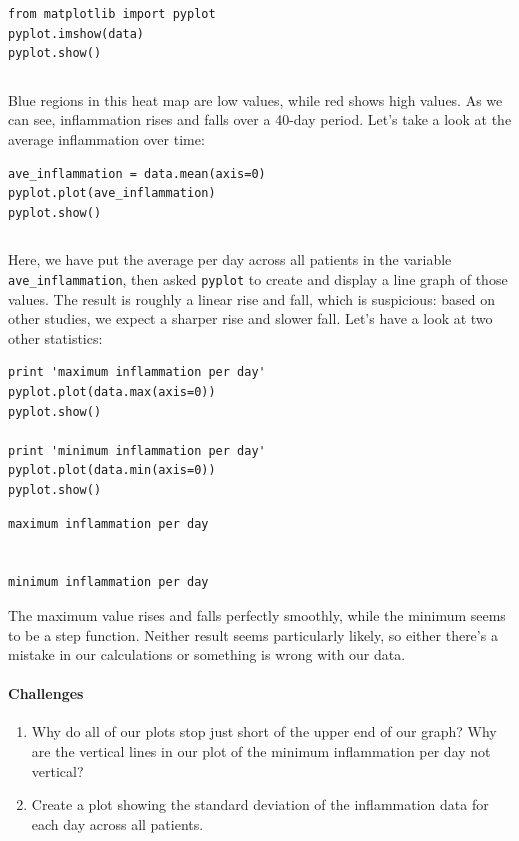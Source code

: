 \documentclass[]{book}
\begin{document}
\begin{verbatim}
from matplotlib import pyplot
pyplot.imshow(data)
pyplot.show()
\end{verbatim}

\begin{verbatim}
\end{verbatim}

Blue regions in this heat map are low values, while red shows high
values. As we can see, inflammation rises and falls over a 40-day
period. Let's take a look at the average inflammation over time:

\begin{verbatim}
ave_inflammation = data.mean(axis=0)
pyplot.plot(ave_inflammation)
pyplot.show()
\end{verbatim}

\begin{verbatim}
\end{verbatim}

Here, we have put the average per day across all patients in the
variable \texttt{ave\_inflammation}, then asked \texttt{pyplot} to
create and display a line graph of those values. The result is roughly a
linear rise and fall, which is suspicious: based on other studies, we
expect a sharper rise and slower fall. Let's have a look at two other
statistics:

\begin{verbatim}
print 'maximum inflammation per day'
pyplot.plot(data.max(axis=0))
pyplot.show()

print 'minimum inflammation per day'
pyplot.plot(data.min(axis=0))
pyplot.show()
\end{verbatim}

\begin{verbatim}
maximum inflammation per day


minimum inflammation per day

\end{verbatim}

The maximum value rises and falls perfectly smoothly, while the minimum
seems to be a step function. Neither result seems particularly likely,
so either there's a mistake in our calculations or something is wrong
with our data.

\mbox{}\paragraph{Challenges}

\begin{enumerate}
\item
  Why do all of our plots stop just short of the upper end of our graph?
  Why are the vertical lines in our plot of the minimum inflammation per
  day not vertical?
\item
  Create a plot showing the standard deviation of the inflammation data
  for each day across all patients.
\end{enumerate}
\end{document}
